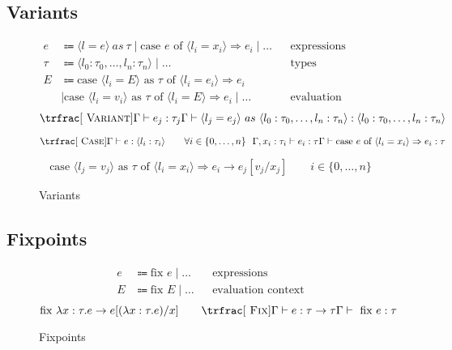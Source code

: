 \documentclass[nonacm]{acmart}
\newcommand{\caseof}[3]{\text{case } \langle#1 \rangle\text{ as } \tau\text{ of } \langle#2\rangle\Rightarrow#3}
\begin{document}
\subsection{Variants}

\begin{figure}
  \begin{framed}
    \begin{align*}
      e          & \Coloneqq \langle l = e \rangle~as~\tau \mid \text{case } e \text{ of } \langle l_i = x_i \rangle \Rightarrow e_i \mid \dots &                            & \text{expressions} \\
      \tau       & \Coloneqq \langle l_0 : \tau_0, \dots, l_n : \tau_n \rangle \mid \dots                                                       &                            & \text{types}       \\
      E          & \Coloneqq \text{case } \langle l_i = E \rangle \text{ as } \tau \text{ of } \langle l_i = e_i \rangle \Rightarrow e_i                                                          \\
                 & \mid \caseof{l_i = v_i}{l_i = E}{e_i}
      \mid \dots &                                                                                                                              & \text{evaluation contexts}
    \end{align*}
    \[
      \trfrac[~\textsc{Variant}]{\Gamma \vdash e_j : \tau_j}{
        \Gamma \vdash \langle l_j = e_j \rangle~as~\langle l_0 : \tau_0, \dots, l_n : \tau_n \rangle : \langle l_0 : \tau_0, \dots, l_n : \tau_n \rangle
      }
    \]

    \[
      \trfrac[~\textsc{Case}]{\Gamma \vdash e : \langle l_i : \tau_i \rangle \qquad \forall i \in \{0,\dots,n\}~~\Gamma, x_i : \tau_i \vdash e_i : \tau}{\Gamma \vdash \text{case } e \text{ of } \langle l_i = x_i \rangle \Rightarrow e_i : \tau}
    \]

    \[
      \caseof{ l_j = v_j}{l_i = x_i}{e_i} \rightarrow e_j[v_j/x_j] \qquad i \in \{0, \dots, n\}
    \]
  \end{framed}
  \caption{Variants}\label{fig:variants}
\end{figure}

\subsection{Fixpoints}

\begin{figure}
  \begin{framed}
    \begin{align*}
      e & \Coloneqq \text{fix } e \mid \dots &  & \text{expressions}        \\
      E & \Coloneqq \text{fix } E \mid \dots &  & \text{evaluation context}
    \end{align*}
    \[
      \text{fix } \lambda x : \tau . e \rightarrow e[(\lambda x : \tau . e)/x]
      \qquad
      \trfrac[~\textsc{Fix}]{\Gamma \vdash e : \tau \rightarrow \tau}{\Gamma \vdash \text{ fix } e : \tau}
    \]
  \end{framed}
  \caption{Fixpoints}\label{fig:fixpoints}
\end{figure}
\end{document}
